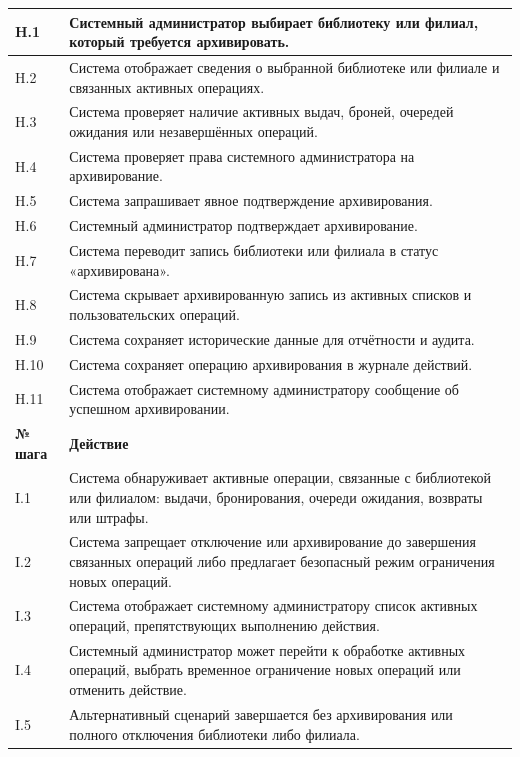\documentclass[12pt,a4paper]{article}
\begin{document}
\begin{xltabular}{\textwidth}{
				|>{\raggedright\arraybackslash}p{2.7cm}
				|>{\raggedright\arraybackslash}X|
			}
			H.1 & Системный администратор выбирает библиотеку или филиал, который
			требуется архивировать. \\
			\hline
			H.2 & Система отображает сведения о выбранной библиотеке или филиале и
			связанных активных операциях. \\
			\hline
			H.3 & Система проверяет наличие активных выдач, броней, очередей ожидания
			или незавершённых операций. \\
			\hline
			H.4 & Система проверяет права системного администратора на архивирование. \\
			\hline
			H.5 & Система запрашивает явное подтверждение архивирования. \\
			\hline
			H.6 & Системный администратор подтверждает архивирование. \\
			\hline
			H.7 & Система переводит запись библиотеки или филиала в статус
			«архивирована». \\
			\hline
			H.8 & Система скрывает архивированную запись из активных списков и
			пользовательских операций. \\
			\hline
			H.9 & Система сохраняет исторические данные для отчётности и аудита. \\
			\hline
			H.10 & Система сохраняет операцию архивирования в журнале действий. \\
			\hline
			H.11 & Система отображает системному администратору сообщение об успешном
			архивировании. \\
			\hline
			
			
			\textbf{№ шага} & \textbf{Действие} \\
			\hline
			
			I.1 & Система обнаруживает активные операции, связанные с библиотекой или
			филиалом: выдачи, бронирования, очереди ожидания, возвраты или
			штрафы. \\
			\hline
			I.2 & Система запрещает отключение или архивирование до завершения
			связанных операций либо предлагает безопасный режим ограничения
			новых операций. \\
			\hline
			I.3 & Система отображает системному администратору список активных
			операций, препятствующих выполнению действия. \\
			\hline
			I.4 & Системный администратор может перейти к обработке активных операций,
			выбрать временное ограничение новых операций или отменить действие. \\
			\hline
			I.5 & Альтернативный сценарий завершается без архивирования или полного
			отключения библиотеки либо филиала. \\
			\hline
			

\end{xltabular}
\end{document}
